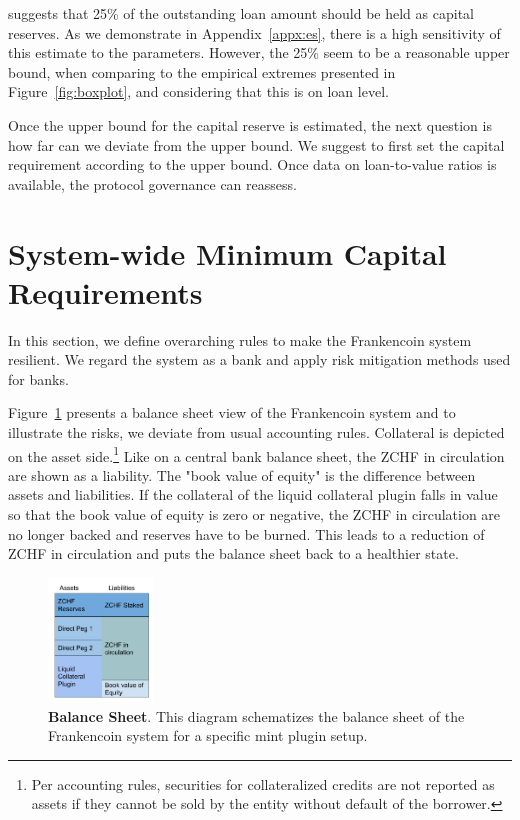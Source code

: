 \documentclass[english,11pt]{article}
\begin{document}
suggests that 25\% of the outstanding loan amount should be held as capital reserves.
As we demonstrate in Appendix~\ref{appx:es}, there is a high sensitivity of this estimate
to the parameters. However, the 25\% seem to be a reasonable upper bound, when
comparing to the empirical extremes presented in Figure~\ref{fig:boxplot}, and
considering that this is on loan level.

Once the upper bound for the capital reserve is estimated, the next question is how far can 
we deviate from the upper bound. We suggest to first set the capital requirement according
to the upper bound. Once data on loan-to-value ratios is available, the protocol governance can
reassess.

\section{System-wide Minimum Capital Requirements}
In this section, we define overarching rules to make the Frankencoin system
resilient. We regard the system as a bank and apply risk mitigation methods
used for banks.

Figure~\ref{fig:bs} presents a balance sheet view of the Frankencoin system
and to illustrate the risks, we deviate from usual accounting rules.
Collateral is depicted on the asset side.\footnote{Per accounting rules, 
securities for collateralized credits are not reported as assets
if they cannot be sold by the entity without default of the borrower.}
Like on a central bank balance sheet, the ZCHF in circulation are shown
as a liability. The "book value of equity" is the difference between assets
and liabilities. If the collateral of the liquid collateral plugin falls in value so that
the book value of equity is zero or negative, the ZCHF in circulation
are no longer backed and reserves have to be burned. This leads
to a reduction of ZCHF in circulation and puts the balance sheet back to
a healthier state.

\begin{figure}[h]
    \center
    \includegraphics[width=0.25\textwidth]{FCBalanceSheet.pdf}
    \caption{\textbf{Balance Sheet}. This diagram
    schematizes the balance sheet of the Frankencoin system for
    a specific mint plugin setup.}\label{fig:bs}
\end{figure}
\end{document}
